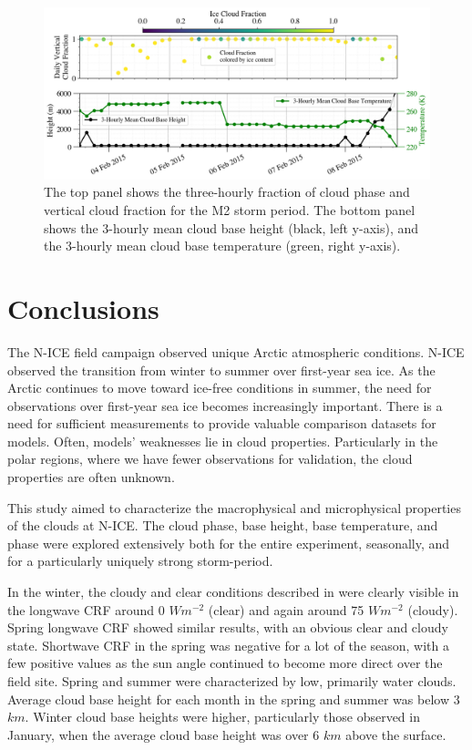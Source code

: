 \begin{figure}[h]
    \centering
    \includegraphics[width=1\linewidth]{figures/chapter4/CloudSummary_M2.png}
    \caption[Cloud phase, fraction, base height, and base temperature.]{The top panel shows the three-hourly fraction of cloud phase and vertical cloud fraction for the M2 storm period. The bottom panel shows the 3-hourly mean cloud base height (black, left y-axis), and the 3-hourly mean cloud base temperature (green, right y-axis).}
    \label{fig:clouds}
\end{figure}

\section{Conclusions}
The N-ICE field campaign observed unique Arctic atmospheric conditions. N-ICE observed the transition from winter to summer over first-year sea ice. As the Arctic continues to move toward ice-free conditions in summer, the need for observations over first-year sea ice becomes increasingly important. There is a need for sufficient measurements to provide valuable comparison datasets for models. Often, models' weaknesses lie in cloud properties. Particularly in the polar regions, where we have fewer observations for validation, the cloud properties are often unknown.

This study aimed to characterize the macrophysical and microphysical properties of the clouds at N-ICE. The cloud phase, base height, base temperature, and phase were explored extensively both for the entire experiment, seasonally, and for a particularly uniquely strong storm-period. 

In the winter, the cloudy and clear conditions described in \citet{graham:2017} were clearly visible in the longwave CRF around 0 $Wm^{-2}$ (clear) and again around 75 $Wm^{-2}$ (cloudy). Spring longwave CRF showed similar results, with an obvious clear and cloudy state. Shortwave CRF in the spring was negative for a lot of the season, with a few positive values as the sun angle continued to become more direct over the field site. Spring and summer were characterized by low, primarily water clouds. Average cloud base height for each month in the spring and summer was below 3 $km$. Winter cloud base heights were higher, particularly those observed in January, when the average cloud base height was over 6 $km$ above the surface.

